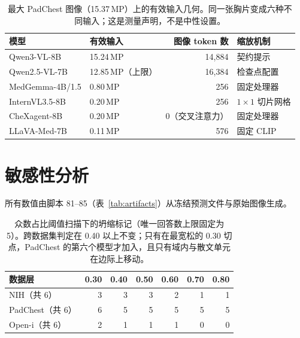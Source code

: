 \begin{table}[H]
\centering
\small
\caption{最大 PadChest 图像（15.37\,MP）上的有效输入几何。同一张胸片变成六种不同输入；这是测量声明，不是中性设置。}
\label{tab:geometry}
\begin{tabular}{llrl}
\toprule
模型 & 有效输入 & 图像 token 数 & 缩放机制 \\
\midrule
Qwen3-VL-8B & 15.24\,MP & 14,884 & 契约提示 \\
Qwen2.5-VL-7B & 12.85\,MP（上限） & 16,384 & 检查点配置 \\
MedGemma-4B/1.5 & 0.80\,MP & 256 & 固定处理器 \\
InternVL3.5-8B & 0.20\,MP & 256 & $1\times1$ 切片网格 \\
CheXagent-8B & 0.20\,MP & 0（交叉注意力） & 固定处理器 \\
LLaVA-Med-7B & 0.11\,MP & 576 & 固定 CLIP \\
\bottomrule
\end{tabular}
\end{table}

\section{敏感性分析}
\label{app:risk}

所有数值由脚本 81--85（表~\ref{tab:artifacts}）从冻结预测文件与原始图像生成。

\begin{table}[H]
\centering
\small
\caption{众数占比阈值扫描下的坍缩标记（唯一回答数上限固定为 5）。跨数据集判定在 0.40 以上不变；只有在最宽松的 0.30 切点，PadChest 的第六个模型才加入，且只有域内与散文单元在边际上移动。}
\label{tab:sweep}
\begin{tabular}{lrrrrrr}
\toprule
数据层 & 0.30 & 0.40 & 0.50 & 0.60 & 0.70 & 0.80 \\
\midrule
NIH（共 6） & 3 & 3 & 3 & 2 & 1 & 1 \\
PadChest（共 6） & 6 & 5 & 5 & 5 & 5 & 5 \\
Open-i（共 6） & 2 & 1 & 1 & 1 & 0 & 0 \\
\bottomrule
\end{tabular}
\end{table}

